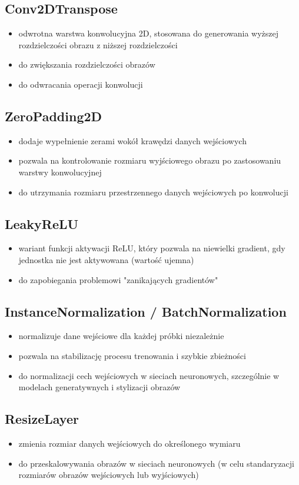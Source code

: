 \documentclass{article}
\begin{document}
\subsection{Conv2DTranspose}
\begin{itemize}
    \item odwrotna warstwa konwolucyjna 2D, stosowana do generowania wyższej rozdzielczości obrazu z niższej rozdzielczości
    \item do zwiększania rozdzielczości obrazów
    \item do odwracania operacji konwolucji
\end{itemize}

\subsection{ZeroPadding2D}
\begin{itemize}
    \item dodaje wypełnienie zerami wokół krawędzi danych wejściowych
    \item pozwala na kontrolowanie rozmiaru wyjściowego obrazu po zastosowaniu warstwy konwolucyjnej
    \item do utrzymania rozmiaru przestrzennego danych wejściowych po konwolucji
\end{itemize}

\subsection{LeakyReLU}
\begin{itemize}
    \item wariant funkcji aktywacji ReLU, który pozwala na niewielki gradient, gdy jednostka nie jest aktywowana (wartość ujemna)
    \item do zapobiegania problemowi "zanikających gradientów"
\end{itemize}

\subsection{InstanceNormalization / BatchNormalization}
\begin{itemize}
    \item normalizuje dane wejściowe dla każdej próbki niezależnie
    \item pozwala na stabilizację procesu trenowania i szybkie zbieżności
    \item do normalizacji cech wejściowych w sieciach neuronowych, szczególnie w modelach generatywnych i stylizacji obrazów
\end{itemize}

\subsection{ResizeLayer}
\begin{itemize}
    \item zmienia rozmiar danych wejściowych do określonego wymiaru
    \item do przeskalowywania obrazów w sieciach neuronowych (w celu standaryzacji rozmiarów obrazów wejściowych lub wyjściowych)
\end{itemize}
\end{document}
